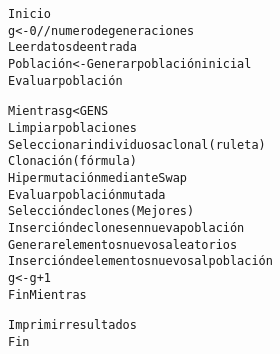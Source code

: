 \begin{alltt}
    Inicio
    g <- 0 // numero de generaciones
    Leer datos de entrada
    Población <- Generar población inicial
    Evaluar población

    Mientras g < GENS
        Limpiar poblaciones
        Seleccionar individuos a clonal (ruleta)
        Clonación (fórmula)
        Hipermutación mediante Swap
        Evaluar población mutada
        Selección de clones (Mejores)
        Inserción de clones en nueva población
        Generar elementos nuevos aleatorios
        Inserción de elementos nuevos al población
        g <- g + 1
    Fin Mientras

    Imprimir resultados
    Fin
\end{alltt}
